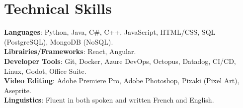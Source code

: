 \documentclass[letterpaper,11pt]{article}
\begin{document}
\section{Technical Skills}
 \begin{itemize}[leftmargin=0.15in, label={}]
    \small{\item{
     \textbf{Languages}{: Python, Java, C\#, C++, JavaScript, HTML/CSS, SQL (PostgreSQL), MongoDB (NoSQL).} \\
     \textbf{Librairies/Frameworks}{: React, Angular.} \\
     \textbf{Developer Tools}{: Git, Docker, Azure DevOps, Octopus, Datadog, CI/CD, Linux, Godot, Office Suite.} \\
     \textbf{Video Editing}{: Adobe Premiere Pro, Adobe Photoshop, Pixaki (Pixel Art), Aseprite.} \\
     \textbf{Linguistics}{: Fluent in both spoken and written French and English.}
    }}
 \end{itemize}



\end{document}
